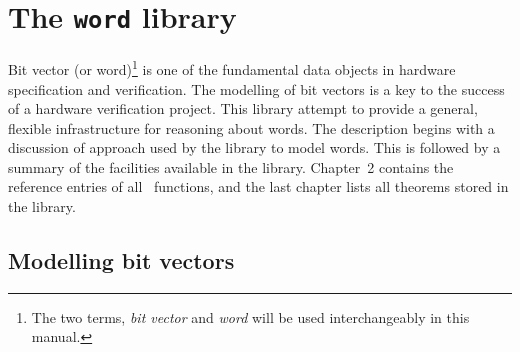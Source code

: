 \def\constantlabel#1{\CONST{#1}\hfil}
\def\constants{\list{}{\labelwidth\leftmargin \labelsep 0pt%
 \let\makelabel\constantlabel}}
\let\endconstants\endlist

\def\theoremlabel#1{{\tt#1}\hfil}
\def\theorems{\list{}{\labelwidth\leftmargin \labelsep 0pt%
 \let\makelabel\theoremlabel}}
\let\endtheorems\endlist

\def\wordnn{\mbox{\tt :word($n$)}}
\def\wordmn{\mbox{\tt word($n$)}}
\def\wordn{{\tt :word$n$}}
\def\word#1{{\tt:(#1)word}}
\def\nword#1{\left[\mkern-2.5mu\left|#1\right|\mkern-2mu\right]}
\def\wcat{\lower.4ex\hbox{$\bullet$}}

\chapter{The {\tt word} library}

Bit vector (or word)\footnote{The two terms, {\it bit vector\/} and
{\it word\/} will be used interchangeably in this manual.}  is one of
the fundamental data objects in hardware  
specification and verification. The modelling of bit vectors is a
key to the success of a hardware verification project. This library
attempt to provide a general, flexible infrastructure for reasoning about
words. The description begins with a discussion of approach used
by the library to model words. This is followed by a summary of the
facilities available in the library. Chapter~2 contains the reference
entries of all \ML\ functions, and the last chapter lists all theorems
stored in the library.

\section{Modelling bit vectors}\label{sec-abs}


